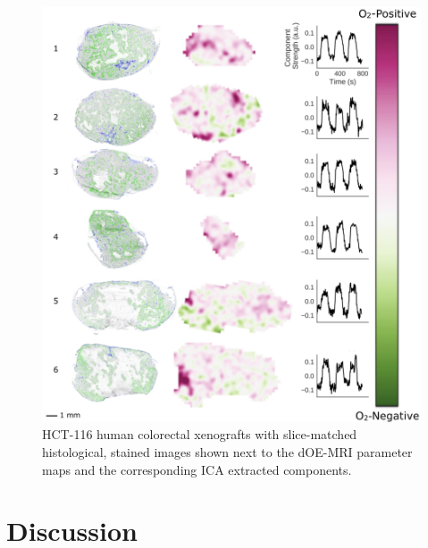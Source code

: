 \begin{figure}[htbp]
   \centering
   \includegraphics[width=\textwidth]{oemri/oemri-images/oemri_hctfigure.png} %
   \caption{HCT-116 human colorectal xenografts with slice-matched histological, stained images shown next to the dOE-MRI parameter maps and the corresponding ICA extracted components.}
   \label{hctfigure}
\end{figure}

\section{Discussion}


